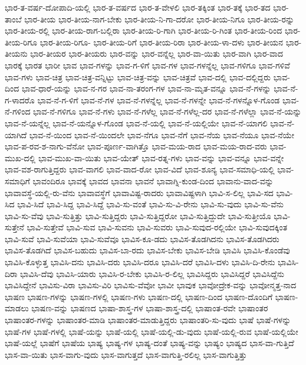 {ಭಾರ-ತ-ವರ್ಷ-ದೋಪಾದಿ-ಯಲ್ಲಿ
ಭಾರ-ತ-ವರ್ಷದ
ಭಾರ-ತ-ವೇಳಲಿ
ಭಾರ-ತಕ್ಕಿಂತ
ಭಾರ-ತಕ್ಕೆ
ಭಾರ-ತದ
ಭಾರ-ತಾಂಬೆ
ಭಾರ-ತೀಯ
ಭಾರ-ತೀಯ-ನಾಗ-ಬೇಕು
ಭಾರ-ತೀಯ-ನಿ-ಗಾ-ದರೋ
ಭಾರ-ತೀಯ-ನಿಗೂ
ಭಾರ-ತೀಯ-ರನ್ನು
ಭಾರ-ತೀಯ-ರಲ್ಲಿ
ಭಾರ-ತೀಯ-ರಾಗ-ಬಲ್ಲಿರಾ
ಭಾರ-ತೀಯ-ರಿ-ಗಾಗಿ
ಭಾರ-ತೀಯ-ರಿ-ಗಿಂತ
ಭಾರ-ತೀಯ-ರಿಂದ
ಭಾರ-ತೀಯ-ರಿಗೂ
ಭಾರ-ತೀಯ-ರಿಗೂ-
ಭಾರ-ತೀಯ-ರಿಗೆ
ಭಾರ-ತೀಯ-ರಿರಾ
ಭಾರ-ತೀಯ-ಳಾ-ದಳು
ಭಾರ-ತೀಯನ
ಭಾರ-ತೀಯನು
ಭಾರ-ತೀಯರ
ಭಾರ-ತೀಯರು
ಭಾರ-ವನ್ನು
ಭಾರ-ವನ್ನೆಲ್ಲ
ಭಾರ-ವಾ-ಯಿತು
ಭಾರ-ವಾಗಿ
ಭಾರ-ವಾದ
ಭಾರಕ್ಕೆ
ಭಾರತ
ಭಾರೀ
ಭಾವ
ಭಾವ-ಗಳನ್ನು
ಭಾವ-ಗ-ಳಿಗೆ
ಭಾವ-ಗಳ
ಭಾವ-ಗಳನ್ನೆಲ್ಲ
ಭಾವ-ಗಳಿಗೂ
ಭಾವ-ಗಳಿವೆ
ಭಾವ-ಗಳು
ಭಾವ-ಚಿತ್ರ
ಭಾವ-ಚಿತ್ರ-ವನ್ನಿಟ್ಟು
ಭಾವ-ಚಿತ್ರ-ವನ್ನು
ಭಾವ-ಚಿತ್ರವೆ
ಭಾವ-ದಲ್ಲಿ
ಭಾವ-ದಲ್ಲಿದ್ದರು
ಭಾವ-ದಿಂದ
ಭಾವ-ಧಾರೆ-ಯನ್ನು
ಭಾವ-ನ-ಗರ
ಭಾವ-ನಾ-ತರಂಗ-ಗಳ
ಭಾವ-ನಾ-ಮೃತ-ವನ್ನೂ
ಭಾವ-ನೆ-ಗಳನ್ನು
ಭಾವ-ನೆ-ಗ-ಳಾದರೊ
ಭಾವ-ನೆ-ಗ-ಳಿಗೆ
ಭಾವ-ನೆ-ಗಳ
ಭಾವ-ನೆ-ಗಳನ್ನೆಲ್ಲ
ಭಾವ-ನೆ-ಗಳನ್ನೇ
ಭಾವ-ನೆ-ಗಳನ್ನೊಳ-ಗೊಂಡ
ಭಾವ-ನೆ-ಗಳಿಂದ
ಭಾವ-ನೆ-ಗಳಿಗೂ
ಭಾವ-ನೆ-ಗಳು
ಭಾವ-ನೆ-ಗಳೆಲ್ಲ
ಭಾವ-ನೆ-ಗಳೆಲ್ಲ-ದರ
ಭಾವ-ನೆ-ಗಳೆಲ್ಲಾ
ಭಾವ-ನೆ-ಯನ್ನು
ಭಾವ-ನೆ-ಯನ್ನೆಲ್ಲ
ಭಾವ-ನೆ-ಯನ್ನೊಳ-ಗೊಂಡ
ಭಾವ-ನೆ-ಯಲ್ಲಿ
ಭಾವ-ನೆ-ಯಲ್ಲಿಯೇ
ಭಾವ-ನೆ-ಯಾಗಲಿ
ಭಾವ-ನೆ-ಯಾಗಿದೆ
ಭಾವ-ನೆ-ಯಿಂದ
ಭಾವ-ನೆ-ಯಿಂದಲೇ
ಭಾವ-ನೆಗೂ
ಭಾವ-ನೆಗೆ
ಭಾವ-ನೆಯ
ಭಾವ-ನೆಯೂ
ಭಾವ-ನೆಯೇ
ಭಾವ-ಪ-ರವ-ಶ-ನಾಗು-ವೆನೋ
ಭಾವ-ಪೂರ್ಣ-ವಾಗಿತ್ತೊ
ಭಾವ-ಮಯ-ರಾದ
ಭಾವ-ಮಯ-ರಾದ-ವರು
ಭಾವ-ಮುಖ-ದಲ್ಲಿ
ಭಾವ-ಮುಖ-ವಾ-ಯಿತು
ಭಾವ-ಯೇತ್
ಭಾವ-ರತ್ನ-ಗಳು
ಭಾವ-ವನ್ನು
ಭಾವ-ವನ್ನೂ
ಭಾವ-ವನ್ನೇ
ಭಾವ-ವಶ-ರಾಗುತ್ತಿದ್ದರು
ಭಾವ-ವಾಗಲಿ
ಭಾವ-ವಾದ-ರೋ
ಭಾವ-ವಿದೆ
ಭಾವ-ಶೂನ್ಯ
ಭಾವ-ಸಮಾಧಿ-ಯಲ್ಲಿ
ಭಾವ-ಸಮಾಧಿಗೆ
ಭಾವಂದಿರೂ
ಭಾವಕ್ಕೆ
ಭಾವದ
ಭಾವನಾ
ಭಾವನೆ
ಭಾವಾಗ್ನಿ-ಕುಂಡ-ದಿಂದ
ಭಾವಾನು-ವಾದ-ವನ್ನು
ಭಾವಾವಸ್ಥೆ-ಯಲ್ಲಿ-ರು-ವೆನು
ಭಾವಾವಸ್ಥೆಗೆ
ಭಾವಾವಿಷ್ಟ-ರಾದರು
ಭಾವಾವಿಷ್ಟಳಾಗಿ
ಭಾವಿ-ಸ-ಲಿಲ್ಲ
ಭಾವಿ-ಸದ
ಭಾವಿ-ಸಿದ
ಭಾವಿ-ಸಿದೆ
ಭಾವಿ-ಸಿದ್ದ
ಭಾವಿ-ಸಿದ್ದೆ
ಭಾವಿ-ಸು-ವಂತೆ
ಭಾವಿ-ಸು-ವಿ-ರೇನು
ಭಾವಿ-ಸು-ವುದು
ಭಾವಿ-ಸು-ವೆನು
ಭಾವಿ-ಸು-ವೆವು
ಭಾವಿ-ಸುತ್ತಿತ್ತು
ಭಾವಿ-ಸುತ್ತಿದ್ದರು
ಭಾವಿ-ಸುತ್ತಿದ್ದರೋ
ಭಾವಿ-ಸುತ್ತಿದ್ದುದೇ
ಭಾವಿ-ಸುತ್ತೀಯೊ
ಭಾವಿ-ಸುತ್ತೇನೆ
ಭಾವಿ-ಸುತ್ತೇವೆ
ಭಾವಿ-ಸುವ
ಭಾವಿ-ಸುವನು
ಭಾವಿ-ಸುವರು
ಭಾವಿ-ಸುವುದ-ರಲ್ಲಿಯೇ
ಭಾವಿ-ಸುವುದಕ್ಕಿಂತ
ಭಾವಿ-ಸುವೆ
ಭಾವಿ-ಸುವೆಯಾ
ಭಾವಿ-ಸುವೆವೂ
ಭಾವಿಸ-ಕೂ-ಡದು
ಭಾವಿಸ-ತೊಡಗಿದನು
ಭಾವಿಸ-ತೊಡಗಿದರು
ಭಾವಿಸ-ತೊಡಗಿದೆ
ಭಾವಿಸ-ಬಹುದು
ಭಾವಿಸ-ಬಾ-ರದು
ಭಾವಿಸ-ಬೇಕು
ಭಾವಿಸ-ಬೇಡಿ
ಭಾವಿಸಿ
ಭಾವಿಸಿ-ಕೊಂಡೆವು
ಭಾವಿಸಿ-ಕೊಳ್ಳುತ್ತ
ಭಾವಿಸಿ-ದನು
ಭಾವಿಸಿ-ದರು
ಭಾವಿಸಿ-ದರೂ
ಭಾವಿಸಿ-ದರೆ
ಭಾವಿಸಿ-ದಳು
ಭಾವಿಸಿ-ದಿ-ರೇನು
ಭಾವಿಸಿ-ದಿರಾ
ಭಾವಿಸಿ-ದೆವು
ಭಾವಿಸಿ-ಯಾರು
ಭಾವಿಸಿ-ರ-ಬೇಕು
ಭಾವಿಸಿ-ರ-ಲಿಲ್ಲ
ಭಾವಿಸಿದ್ದರು
ಭಾವಿಸಿದ್ದರೆ
ಭಾವಿಸಿದ್ದೆನು
ಭಾವಿಸಿದ್ದೇನೆ
ಭಾವಿಸು-ವಿರಾ
ಭಾವಿಸು-ವಿರಿ
ಭಾವಿಸು-ವೆವೋ
ಭಾವೀ
ಭಾವುಕ
ಭಾವೋದ್ರೇಕ-ವನ್ನು
ಭಾವೋನ್ಮತ್ತ-ನಾದ
ಭಾಷಣ
ಭಾಷಣ-ಗಳನ್ನು
ಭಾಷಣ-ಗಳಲ್ಲಿ
ಭಾಷಣ-ಗಳು
ಭಾಷಣ-ದಲ್ಲಿ
ಭಾಷಣ-ದಿಂದ
ಭಾಷಣ-ದೊಂದಿಗೆ
ಭಾಷಣ-ಮಾಡಲು
ಭಾಷಣ-ವನ್ನು
ಭಾಷಣದ
ಭಾಷಾ-ಶಾಸ್ತ್ರ-ಗಳ
ಭಾಷಾ-ಶಾಸ್ತ್ರ-ದಲ್ಲಿ
ಭಾಷಾಂತ-ರವೇ
ಭಾಷಾಂತರ
ಭಾಷಾಂತರ-ಗಳನ್ನು
ಭಾಷಾಂತರ-ಮಾಡಿ
ಭಾಷಾಂತರ-ಮಾಡುತ್ತಿದ್ದರು
ಭಾಷಾಂತರಿ-ಸು-ವುದು
ಭಾಷೆ
ಭಾಷೆ-ಗಳನ್ನು
ಭಾಷೆ-ಗಳ
ಭಾಷೆ-ಗಳಲ್ಲಿ
ಭಾಷೆ-ಯನ್ನು
ಭಾಷೆ-ಯಲ್ಲಿ
ಭಾಷೆ-ಯಲ್ಲಿ-ಡು-ವುದು
ಭಾಷೆ-ಯಲ್ಲಿ-ರುವ
ಭಾಷೆ-ಯಲ್ಲಿಯೇ
ಭಾಷೆ-ಯಲ್ಲೆ
ಭಾಷೆಗೆ
ಭಾಷೆಯ
ಭಾಷ್ಯ
ಭಾಷ್ಯ-ಗಳ
ಭಾಷ್ಯ-ದಂತೆ
ಭಾಷ್ಯ-ವನ್ನು
ಭಾಷ್ಯಂ
ಭಾಷ್ಯದ
ಭಾಸ-ವಾ-ಗುತ್ತಿದೆ
ಭಾಸ-ವಾ-ಯಿತು
ಭಾಸ-ವಾಗು-ವುದು
ಭಾಸ-ವಾಗುತ್ತದೆ
ಭಾಸ-ವಾಗುತ್ತಿ-ರಲಿಲ್ಲ
ಭಾಸ-ವಾಗುತ್ತಿತ್ತು
}
